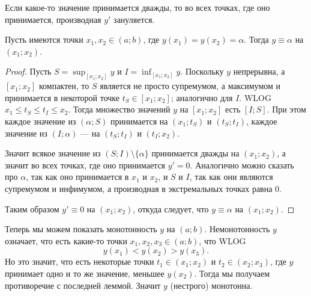\documentclass[12pt,a4paper]{article}
\begin{document}
\begin{problem*}[№1]
        \begin{corollary}
            Если какое-то значение принимается дважды, то во всех точках, где оно принимается, производная $y'$ зануляется.
        \end{corollary}

        \begin{lemma}
            Пусть имеются точки $x_1, x_2 \in (a; b)$, где $y(x_1) = y(x_2) = \alpha$. Тогда $y \equiv \alpha$ на $(x_1; x_2)$.
        \end{lemma}

        \begin{proof}
            Пусть $S = \sup_{[x_1; x_2]} y$ и $I = \inf_{[x_1; x_2]} y$. Поскольку $y$ непрерывна, а $[x_1; x_2]$ компактен, то $S$ является не просто супремумом, а максимумом и принимается в некоторой точке $t_S \in [x_1; x_2]$; аналогично для $I$. WLOG $x_1 \leqslant t_S \leqslant t_I \leqslant x_2$. Тогда множество значений $y$ на $[x_1; x_2]$ есть $[I; S]$. При этом каждое значение из $(\alpha; S)$ принимается на $(x_1; t_S)$ и $(t_S; t_I)$, каждое значение из $(I; \alpha)$ --- на $(t_S; t_I)$ и $(t_I; x_2)$.
            
            Значит всякое значение из $(S; I) \setminus \{\alpha\}$ принимается дважды на $(x_1; x_2)$, а значит во всех точках, где оно принимается $y' = 0$. Аналогично можно сказать про $\alpha$, так как оно принимается в $x_1$ и $x_2$, и $S$ и $I$, так как они являются супремумом и инфимумом, а производная в экстремальных точках равна $0$.
            
            Таким образом $y' \equiv 0$ на $(x_1; x_2)$, откуда следует, что $y \equiv \alpha$ на $(x_1; x_2)$.
        \end{proof}

        Теперь мы можем показать монотонность $y$ на $(a; b)$. Немонотонность $y$ означает, что есть какие-то точки $x_1, x_2, x_3 \in (a; b)$, что WLOG
        \[y(x_1) < y(x_2) > y(x_3).\]
        Но это значит, что есть некоторые точки $t_1 \in (x_1; x_2)$ и $t_2 \in (x_2; x_3)$, где $y$ принимает одно и то же значение, меньшее $y(x_2)$. Тогда мы получаем противоречие с последней леммой. Значит $y$ (нестрого) монотонна.
    \end{problem*}
\end{document}
